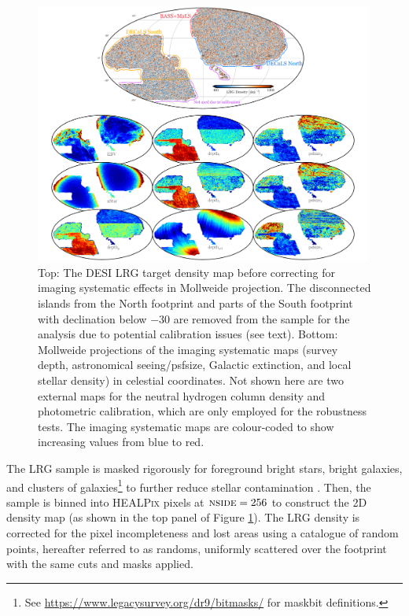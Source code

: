 \begin{figure}
 \centering
 \includegraphics[width=0.99\textwidth]{figures/dr9data.pdf}
 \caption{Top: The DESI LRG target density map before correcting for imaging systematic effects in Mollweide projection. The disconnected islands from the North footprint and parts of the South footprint with declination below $-30$ are removed from the sample for the analysis due to potential calibration issues (see text). Bottom: Mollweide projections of the imaging systematic maps (survey depth, astronomical seeing/psfsize, Galactic extinction, and local stellar density) in celestial coordinates. Not shown here are two external maps for the neutral hydrogen column density and photometric calibration, which are only employed for the robustness tests. The imaging systematic maps are colour-coded to show increasing values from blue to red.}
 \label{fig:ng}
\end{figure}

The LRG sample is masked rigorously for foreground bright stars, bright galaxies, and clusters of galaxies\footnote{See \url{https://www.legacysurvey.org/dr9/bitmasks/} for maskbit definitions.} to further reduce stellar contamination \citep{zhou2022target}. Then, the sample is binned into \textsc{HEALPix} \citep{gorski2005healpix} pixels at $\textsc{nside}=256$ to construct the 2D density map (as shown in the top panel of Figure \ref{fig:ng}). The LRG density is corrected for the pixel incompleteness and lost areas using a catalogue of random points, hereafter referred to as randoms, uniformly scattered over the footprint with the same cuts and masks applied. 

